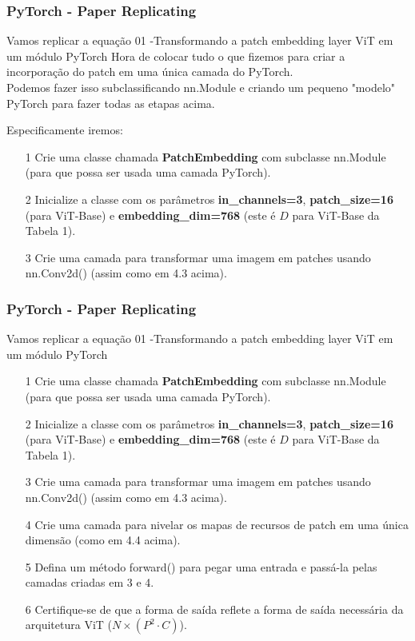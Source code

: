 \documentclass{beamer}
\begin{document}
\begin{frame}
	\frametitle{PyTorch - Paper Replicating}
	\begin{block}{Vamos replicar a equação 01 -Transformando a patch embedding layer ViT em um módulo PyTorch}
		Hora de colocar tudo o que fizemos para criar a incorporação do patch em uma única camada do PyTorch. \\
		
		Podemos fazer isso subclassificando nn.Module e criando um pequeno "modelo" PyTorch para fazer todas as etapas acima.
		
		Especificamente iremos:
		\begin{itemize}
			\item[1] Crie uma classe chamada \textbf{PatchEmbedding} com subclasse nn.Module (para que possa ser usada uma camada PyTorch). 
			\item[2] Inicialize a classe com os parâmetros \textbf{in\_channels=3}, \textbf{patch\_size=16} (para ViT-Base) e \textbf{embedding\_dim=768} (este é $D$ para ViT-Base da Tabela 1).
			\item[3] Crie uma camada para transformar uma imagem em patches usando nn.Conv2d() (assim como em 4.3 acima).
			
		\end{itemize}
	\end{block}
\end{frame}
\begin{frame}
	\frametitle{PyTorch - Paper Replicating}
	\begin{block}{Vamos replicar a equação 01 -Transformando a patch embedding layer ViT em um módulo PyTorch}
		\begin{itemize}
			\item[1] Crie uma classe chamada \textbf{PatchEmbedding} com subclasse nn.Module (para que possa ser usada uma camada PyTorch). 
			\item[2] Inicialize a classe com os parâmetros \textbf{in\_channels=3}, \textbf{patch\_size=16} (para ViT-Base) e \textbf{embedding\_dim=768} (este é $D$ para ViT-Base da Tabela 1).
			\item[3] Crie uma camada para transformar uma imagem em patches usando nn.Conv2d() (assim como em 4.3 acima).
			\item[4] Crie uma camada para nivelar os mapas de recursos de patch em uma única dimensão (como em 4.4 acima).
			\item[5] Defina um método forward() para pegar uma entrada e passá-la pelas camadas criadas em 3 e 4.
			\item[6] Certifique-se de que a forma de saída reflete a forma de saída necessária da arquitetura ViT (${N \times\left(P^{2} \cdot C\right)}$).
		\end{itemize}
	\end{block}
\end{frame}
\end{document}
